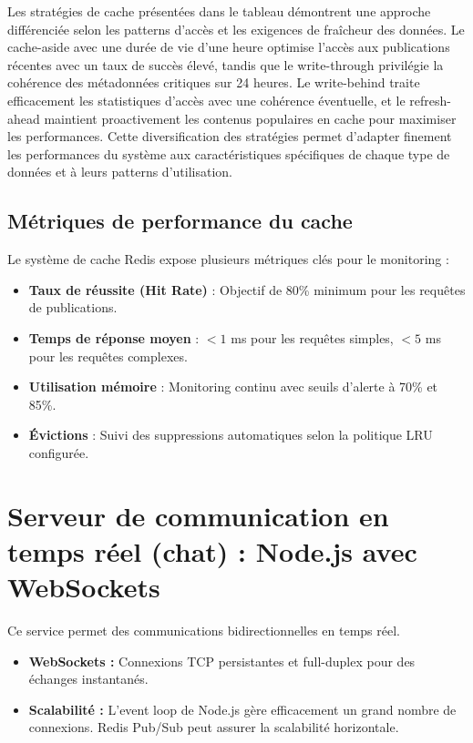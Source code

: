 \documentclass[12pt]{rapportPfe}
\begin{document}
Les stratégies de cache présentées  dans le tableau démontrent une approche différenciée selon les patterns d'accès et les exigences de fraîcheur des données. Le cache-aside avec une durée de vie d'une heure optimise l'accès aux publications récentes avec un taux de succès élevé, tandis que le write-through privilégie la cohérence des métadonnées critiques sur 24 heures. Le write-behind traite efficacement les statistiques d'accès avec une cohérence éventuelle, et le refresh-ahead maintient proactivement les contenus populaires en cache pour maximiser les performances. Cette diversification des stratégies permet d'adapter finement les performances du système aux caractéristiques spécifiques de chaque type de données et à leurs patterns d'utilisation.

\subsection{Métriques de performance du cache}

Le système de cache Redis expose plusieurs métriques clés pour le monitoring :

\begin{itemize}
    \item \textbf{Taux de réussite (Hit Rate)} : Objectif de 80\% minimum pour les requêtes de publications.
    \item \textbf{Temps de réponse moyen} : $< 1$ ms pour les requêtes simples, $< 5$ ms pour les requêtes complexes.
    \item \textbf{Utilisation mémoire} : Monitoring continu avec seuils d'alerte à 70\% et 85\%.
    \item \textbf{Évictions} : Suivi des suppressions automatiques selon la politique LRU configurée.
\end{itemize}

\section{Serveur de communication en temps réel (chat) : Node.js avec WebSockets}

Ce service permet des communications bidirectionnelles en temps réel.

\begin{itemize}
    \item \textbf{WebSockets :} Connexions TCP persistantes et full-duplex pour des échanges instantanés.
    \item \textbf{Scalabilité :} L’event loop de Node.js gère efficacement un grand nombre de connexions. Redis Pub/Sub peut assurer la scalabilité horizontale.
\end{itemize}
\end{document}
